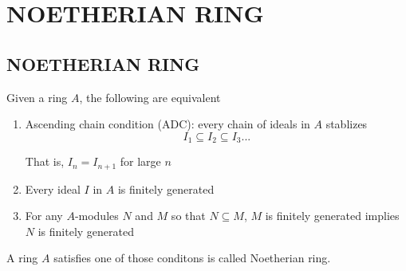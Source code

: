 
\chapter{NOETHERIAN RING}


\section{NOETHERIAN RING}

\begin{definition}
	Given a ring $A$, the following are equivalent
	\begin{enumerate}
		\item Ascending chain condition (ADC): every chain of ideals in $A$ stablizes
		$$
			I_1 \subseteq I_2 \subseteq I_3 ...
		$$
		
		That is, $I_n = I_{n+1}$  for large $n$
		
		\item Every ideal $I$ in $A$ is finitely generated
		
		\item For any $A$-modules $N$ and $M$ so that $N \subseteq M$, $M$ is finitely generated implies $N$ is finitely generated
	\end{enumerate}
	
	A ring $A$ satisfies one of those conditons is called Noetherian ring.
\end{definition}

